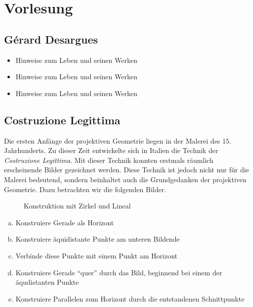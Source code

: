 
\section{Vorlesung}

\subsection*{Gérard Desargues}

\begin{itemize}
    \item Hinweise zum Leben und seinen Werken

    \item Hinweise zum Leben und seinen Werken

    \item Hinweise zum Leben und seinen Werken
\end{itemize}

\subsection*{Costruzione Legittima}
Die ersten Anfänge der projektiven Geometrie liegen in der Malerei des $15.$ Jahrhunderts.  Zu
dieser Zeit entwickelte sich in Italien die Technik der \textsl{Costruzione Legittima}.  Mit dieser
Technik konnten erstmals räumlich erscheinende Bilder gezeichnet werden. Diese Technik ist jedoch
nicht nur für die Malerei bedeutend, sondern beinhaltet auch die Grundgedanken der projektiven
Geometrie. Dazu betrachten wir die folgenden Bilder.
\begin{figure}[ht]
    
    \caption{Konstruktion mit Zirkel und Lineal}
\end{figure}
\begin{enumerate}[(a)] %
    \item Konstruiere Gerade als Horizont
    \item Konstruiere äquidistante Punkte am unteren Bildende
    \item Verbinde diese Punkte mit einem Punkt am Horizont
    \item Konstruiere Gerade "`quer"' durch das Bild, beginnend bei einem der äqudistanten Punkte
    \item Konstruiere Parallelen zum Horizont durch die entstandenen Schnittpunkte
\end{enumerate}


